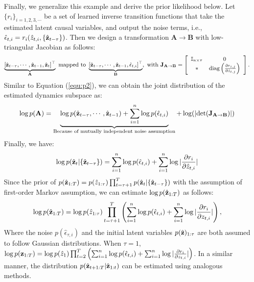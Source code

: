 Finally, we generalize this example and derive the prior likelihood below. Let $\{r_i\}_{i=1,2,3,\cdots}$ be a set of learned inverse transition functions that take the estimated latent causal variables, and output the noise terms, i.e., $\hat{\epsilon}_{t,i}=r_i(\hat{z}_{t,i}, \{ \hat{{\mathbf{z}}}_{t-\tau}\})$. Then we design a transformation $\mathbf{A}\rightarrow \mathbf{B}$ with low-triangular Jacobian as follows:
\begin{equation}
\small
\begin{gathered}
    \underbrace{[\hat{{\mathbf{z}}}_{t-\tau},\cdots,{\hat{{\mathbf{z}}}}_{t-1},{\hat{{\mathbf{z}}}}_{t}]^{\top}}_{\mathbf{A}} \text{  mapped to  } \underbrace{[{\hat{{\mathbf{z}}}}_{t-\tau},\cdots,{\hat{{\mathbf{z}}}}_{t-1},{\hat{\epsilon}}_{t,i}]^{\top}}_{\mathbf{B}}, \text{ with } \mathbf{J}_{\mathbf{A}\rightarrow\mathbf{B}}=
    \begin{bmatrix}
    \begin{array}{cc}
        \mathbb{I}_{n\times \tau} & 0\\
                    * & \text{diag}\left(\frac{\partial r_{i,j}}{\partial {\hat{z}}_{t,j}}\right)
    \end{array}
    \end{bmatrix}.
\end{gathered}
\end{equation}
Similar to Equation (\ref{equ:p2}), we can obtain the joint distribution of the estimated dynamics subspace as:
\begin{equation}
    \log p(\mathbf{A})=\underbrace{\log p({\hat{{\mathbf{z}}}}_{t-\tau},\cdots, {\hat{{\mathbf{z}}}}_{t-1}) + \sum^{n}_{i=1}\log p({\hat{\epsilon}}_{t,i})}_{\text{Because of mutually independent noise assumption}}+\log (|\text{det}(\mathbf{J}_{\mathbf{A}\rightarrow\mathbf{B}})|)
\end{equation}
Finally, we have:
\begin{equation}
\small
    \log p({\hat{{\mathbf{z}}}}_t|\{{\hat{{\mathbf{z}}}}_{t-\tau}\})=\sum_{i=1}^{n} \log {p({\hat{\epsilon}_{t,i}})} + \sum_{i=1}^{n}\log |\frac{\partial r_i}{\partial {\hat{z}}_{t,i}}|
\end{equation} 
Since the prior of $p(\hat{{\mathbf{z}}}_{1:T})=p(\hat{z}_{1:\tau})\prod_{t=\tau+1}^{T} p(\hat{{\mathbf{z}}}_{t}| \{ \hat{{\mathbf{z}}}_{t-\tau}\})$ with the assumption of first-order Markov assumption, we can estimate $\log p(\hat{{\mathbf{z}}}_{1:T})$ as follows:
\begin{equation}
\small
    \log p(\hat{{\mathbf{z}}}_{1:T})=\log {p(\hat{z}_{1:\tau})} \prod_{t=\tau+1}^T\left(\sum_{i=1}^n \log p(\hat{\epsilon}_{t,i}) + \sum_{i=1}^n \log |\frac{\partial r_i}{\partial z_{t,i}}|  \right),
\end{equation}
Where the noise \( p(\hat{\epsilon}_{\tau,i}) \) and the initial latent variables \( p(\hat{{\mathbf{z}}})_{1:\tau} \) are both assumed to follow Gaussian distributions. When $\tau=1$, $\log p({\mathbf{z}}_{1:T})=\log {p(\hat{z}_{1})}\prod_{t=2}^T\left(\sum_{i=1}^n \log p(\hat{\epsilon}_{t,i}) + \sum_{i=1}^n \log |\frac{\partial r_i}{\partial z_{t,i}}|  \right)$. In a similar manner, the distribution \( p(\hat{{\mathbf{z}}}_{t+1:T}|\hat{{\mathbf{z}}}_{1:t}) \) can be estimated using analogous methods.




